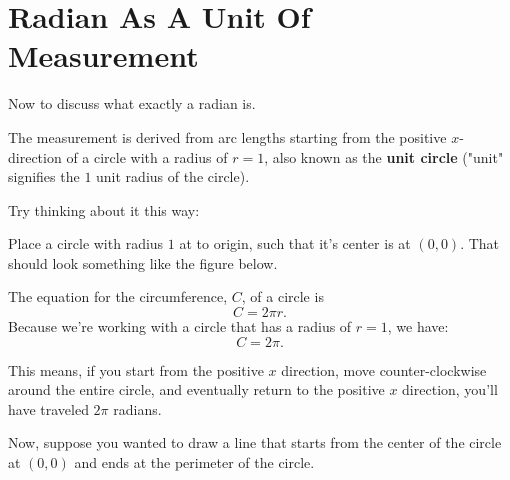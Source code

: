 \clearpage
\section{Radian As A Unit Of Measurement}
Now to discuss what exactly a radian is.

The measurement is derived from arc lengths starting from the positive $x$-direction of a circle with a radius of $r = 1$, also known as the \textbf{unit circle} ("unit" signifies the $1$ unit radius of the circle).

Try thinking about it this way:

Place a circle with radius $1$ at to origin, such that it's center is at $(0,0)$. That should look something like the figure below.
\begin{center}
    \begin{minipage}[c]{0.33\linewidth}
    \end{minipage}
    \begin{minipage}[c]{0.66\linewidth}
        The equation for the circumference, $C$, of a circle is
        \[
            C = 2\pi r \text{.}
        \]
        Because we're working with a circle that has a radius of $r = 1$, we have:
        \[
            C = 2\pi \text{.}
        \]
    \end{minipage}
\end{center}
This means, if you start from the positive $x$ direction, move counter-clockwise around the entire circle, and eventually return to the positive $x$ direction, you'll have traveled $2\pi$ radians.

Now, suppose you wanted to draw a line that starts from the center of the circle at $(0,0)$ and ends at the perimeter of the circle. 

